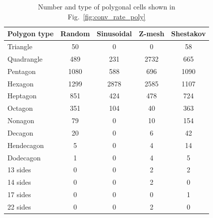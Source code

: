 \documentclass[preprint,10pt]{elsarticle}
\newcommand{\fig}[1]{Fig.~\ref{#1}}                      %
\begin{document}
\begin{table}[!htbp]
	\centering
		\begin{tabular}{|l||c|c|c|c|}
		\hline
Polygon type    &Random &Sinusoidal& Z-mesh& Shestakov  \\ \hline\hline
Triangle        & 50    &    0   &   0     & 58   \\ \hline
Quadrangle      & 489   &  231   &  2732   & 665  \\ \hline
Pentagon        & 1080  &  588   &  696    & 1090 \\ \hline
Hexagon         & 1299  &  2878  &  2585   & 1107 \\ \hline
Heptagon        & 851   &  424   &  478    & 724  \\ \hline
Octagon         & 351   &  104   &  40     & 363  \\ \hline
Nonagon         & 79    &   0    &  10     & 154  \\ \hline
Decagon         &  20   &   0    &   6     & 42   \\ \hline
Hendecagon      &  5    &   0    &   4     & 14   \\ \hline		
Dodecagon       &  1    &   0    &   4     &  5   \\ \hline		
13 sides        &  0    &   0    &   2     &  2   \\ \hline		
14 sides        &  0    &   0    &   2     &  0   \\ \hline		
17 sides        &  0    &   0    &   0     &  1   \\ \hline		
22 sides        &  0    &   0    &   2     &  0   \\ \hline			\end{tabular}
	\caption{Number and type of polygonal cells shown in \fig{fig:conv_rate_poly}}
	\label{tab:poly_cell_types_conv_poly}
\end{table}
\end{document}
